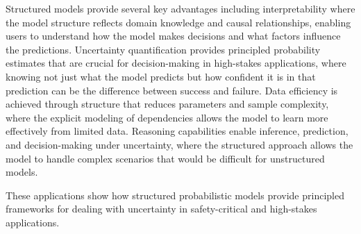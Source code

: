 Structured models provide several key advantages including interpretability where the model structure reflects domain knowledge and causal relationships, enabling users to understand how the model makes decisions and what factors influence the predictions. Uncertainty quantification provides principled probability estimates that are crucial for decision-making in high-stakes applications, where knowing not just what the model predicts but how confident it is in that prediction can be the difference between success and failure. Data efficiency is achieved through structure that reduces parameters and sample complexity, where the explicit modeling of dependencies allows the model to learn more effectively from limited data. Reasoning capabilities enable inference, prediction, and decision-making under uncertainty, where the structured approach allows the model to handle complex scenarios that would be difficult for unstructured models.

These applications show how structured probabilistic models provide principled frameworks for dealing with uncertainty in safety-critical and high-stakes applications.

